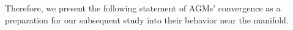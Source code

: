 Therefore, we present the following statement of AGMs' convergence as a preparation for our subsequent study into their behavior near the manifold.










